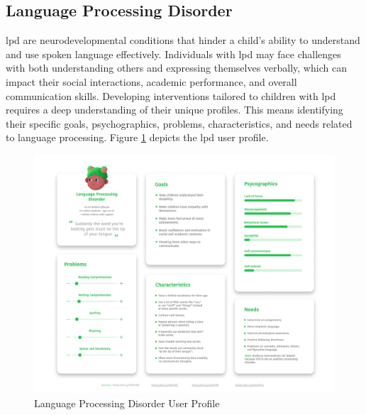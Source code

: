 \subsection{Language Processing Disorder}
\gls{lpd} are neurodevelopmental conditions that hinder a child’s ability to understand and use spoken language effectively. Individuals with \gls{lpd} may face challenges with both understanding others and expressing themselves verbally, which can impact their social interactions, academic performance, and overall communication skills. Developing interventions tailored to children with \gls{lpd} requires a deep understanding of their unique profiles. This means identifying their specific goals, psychographics, problems, characteristics, and needs related to language processing. Figure \ref{fig:lpdUserProfile} depicts the \gls{lpd} user profile.

\begin{figure}[H]
    \centering
    \includegraphics[width=1\linewidth]{Chapters/figma/Language Processing Disorder.png}
    \caption{Language Processing Disorder User Profile}
    \label{fig:lpdUserProfile}
\end{figure}

